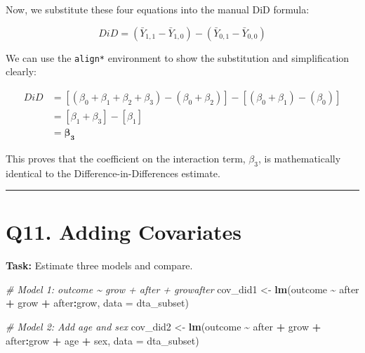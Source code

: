 \documentclass[
]{article}
\newenvironment{Shaded}{\begin{snugshade}}{\end{snugshade}}
\newcommand{\AttributeTok}[1]{\textcolor[rgb]{0.13,0.29,0.53}{#1}}
\newcommand{\CommentTok}[1]{\textcolor[rgb]{0.56,0.35,0.01}{\textit{#1}}}
\newcommand{\FunctionTok}[1]{\textcolor[rgb]{0.13,0.29,0.53}{\textbf{#1}}}
\newcommand{\NormalTok}[1]{#1}
\newcommand{\OtherTok}[1]{\textcolor[rgb]{0.56,0.35,0.01}{#1}}
\newcommand{\SpecialCharTok}[1]{\textcolor[rgb]{0.81,0.36,0.00}{\textbf{#1}}}
\begin{document}
Now, we substitute these four equations into the manual DiD formula:

\[
DiD = (\bar{Y}_{1,1} - \bar{Y}_{1,0}) - (\bar{Y}_{0,1} - \bar{Y}_{0,0})
\]

We can use the \texttt{align*} environment to show the substitution and
simplification clearly:

\begin{align*}
DiD &= \left[ (\beta_0 + \beta_1 + \beta_2 + \beta_3) - (\beta_0 + \beta_2) \right] - \left[ (\beta_0 + \beta_1) - (\beta_0) \right] \\
&= \left[ \beta_1 + \beta_3 \right] - \left[ \beta_1 \right] \\
&= \boldsymbol{\beta_3}
\end{align*}

This proves that the coefficient on the interaction term, \(\beta_3\),
is mathematically identical to the Difference-in-Differences estimate.

\begin{center}\rule{0.5\linewidth}{0.5pt}\end{center}

\section{Q11. Adding Covariates}\label{q11.-adding-covariates}

\textbf{Task:} Estimate three models and compare.

\begin{Shaded}
\begin{Highlighting}[]
\CommentTok{\# Model 1: outcome \textasciitilde{} grow + after + growafter}
\NormalTok{cov\_did1 }\OtherTok{\textless{}{-}} \FunctionTok{lm}\NormalTok{(outcome }\SpecialCharTok{\textasciitilde{}}\NormalTok{ after }\SpecialCharTok{+}\NormalTok{ grow }\SpecialCharTok{+}\NormalTok{ after}\SpecialCharTok{:}\NormalTok{grow, }\AttributeTok{data =}\NormalTok{ dta\_subset)}
\end{Highlighting}
\end{Shaded}

\begin{Shaded}
\begin{Highlighting}[]
\CommentTok{\# Model 2: Add age and sex}
\NormalTok{cov\_did2 }\OtherTok{\textless{}{-}} \FunctionTok{lm}\NormalTok{(outcome }\SpecialCharTok{\textasciitilde{}}\NormalTok{ after }\SpecialCharTok{+}\NormalTok{ grow }\SpecialCharTok{+}\NormalTok{ after}\SpecialCharTok{:}\NormalTok{grow }\SpecialCharTok{+}\NormalTok{ age }\SpecialCharTok{+}\NormalTok{ sex, }\AttributeTok{data =}\NormalTok{ dta\_subset)}
\end{Highlighting}
\end{Shaded}
\end{document}
